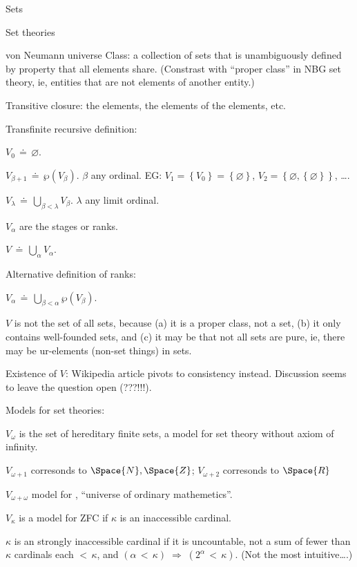 \begin{plSection}{Sets}
\begin{plSection}{Set theories}
\begin{plSection}{von Neumann universe}
Class\cite{wiki:ClassSetTheory}:
a collection of sets that is unambiguously defined
by property that all elements share. 
(Constrast with ``proper class'' 
in NBG set theory\cite{wiki:NBGSetTheory},
ie, entities that are not elements of another entity.)

Transitive closure: the elements, the elements of the elements,
etc.

Transfinite recursive definition:

$V_{0} \,\doteq\, \varnothing$.

$V_{\beta +1} \,\doteq\, \wp(V_{\beta })$.
$\beta$ any ordinal\cite{wiki:OrdinalNumber}.
EG: $V_1 = \left\{ V_0 \right\} = \left\{ \varnothing \right\}$,
 $V_2 = \left\{ \varnothing,  \left\{ \varnothing \right\} \right\}$, \ldots .

$V_{\lambda }\,\doteq\,\bigcup _{\beta <\lambda }V_{\beta }$.
$\lambda$ any limit ordinal\cite{wiki:LimitOrdinal}.

$V_{\alpha}$ are the stages or ranks.

$V\,\doteq\,\bigcup _{\alpha }V_{\alpha }$.

Alternative definition of ranks:

$V_{\alpha }
\,\doteq\,
\bigcup _{\beta <\alpha }\wp(V_{\beta })$.

$V$ is not the set of all sets, 
because (a) it is a proper class, not a set,
(b) it only contains well-founded sets,
and (c) it may be that not all sets are pure,
ie, there may be ur-elements (non-set things) in sets.

Existence of $V$: Wikipedia article pivots to consistency instead.
Discussion seems to leave the question open (???!!!).
 

Models for set theories:

$V_{\omega}$ is the set of hereditary finite sets,
a model for set theory without axiom of infinity.

$V_{\omega+1}$ corresonds to $\Space{N}, \Space{Z}$;
$V_{\omega+2}$ corresonds to $\Space{R}$
 
$V_{\omega+\omega}$ model for ,
``universe of ordinary mathemetics''.

$V_{\kappa}$ is a model for \textsf{ZFC} 
if $\kappa$ is an inaccessible cardinal\cite{wiki:InaccessibleCardinal}.

$\kappa$ is an strongly inaccessible cardinal 
if it is uncountable, 
not a sum of fewer than $\kappa$ cardinals each $<\,\kappa$,
and
$(\alpha \,<\, \kappa) \;\Rightarrow\; (2^{\alpha}\,<\,\kappa)$.
(Not the most intuitive\ldots .)


\end{plSection}
\end{plSection}
\end{plSection}
